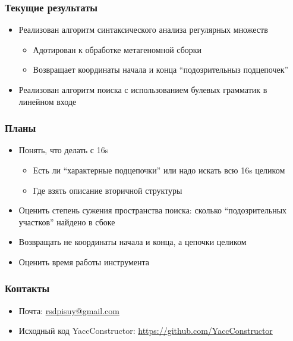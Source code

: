 \documentclass{beamer}
\begin{document}
\begin{frame}
  \transwipe[direction=90]
  \frametitle{Текущие результаты}
  \begin{itemize}
    \item Реализован алгоритм синтаксического анализа регулярных множеств
    \begin{itemize}
        \item Адотирован к обработке метагеномной сборки
        \item Возвращает координаты начала и конца ``подозрительныз подцепочек''
    \end{itemize}
    \item Реализован алгоритм поиска с использованием булевых грамматик в линейном входе
  \end{itemize}
\end{frame}

\begin{frame}
  \transwipe[direction=90]
  \frametitle{Планы}
  \begin{itemize}
    \item Понять, что делать с 16s
      \begin{itemize}
        \item Есть ли ``характерные подцепочки'' или надо искать всю 16s целиком
        \item Где взять описание вторичной структуры
      \end{itemize}
    \item Оценить степень сужения пространства поиска: сколько ``подозрительных участков'' 
    найдено в сбоке
    \item Возвращать не координаты начала и конца, а цепочки целиком
    \item Оценить время работы инструмента
  \end{itemize}
\end{frame}
          
\begin{frame}
\transwipe[direction=90]
\frametitle{Контакты}
\begin{itemize}
  \item Почта: \url{rsdpisuy@gmail.com}
  \item Исходный код YaccConstructor: \url{https://github.com/YaccConstructor}
\end{itemize}
\end{frame}
\end{document}
